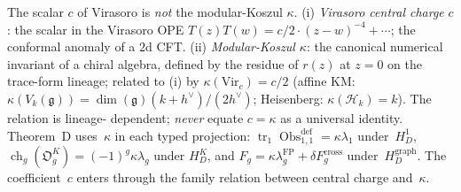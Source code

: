 \begin{description}[itemsep=4pt, leftmargin=2.0em, style=nextline]
\item[T19 (``central charge''--$c$ of Virasoro vs modular-Koszul $\kappa$).]
%
The scalar $c$ of Virasoro is \emph{not} the modular-Koszul $\kappa$.
(i) \emph{Virasoro central charge} $c$: the scalar in the Virasoro
OPE $T(z) T(w) = c/2 \cdot (z-w)^{-4} + \cdots$; the
conformal anomaly of a $2$d CFT.
(ii) \emph{Modular-Koszul $\kappa$}: the canonical numerical invariant
of a chiral algebra, defined by the residue of $r(z)$ at $z = 0$
on the trace-form lineage; related to (i) by
$\kappa(\mathrm{Vir}_c) = c/2$ (affine KM:
$\kappa(V_k(\mathfrak g)) = \dim(\mathfrak g)(k+h^\vee)/(2h^\vee)$;
Heisenberg: $\kappa(\mathcal H_k) = k$). The relation is lineage-
dependent; \emph{never} equate $c = \kappa$ as a universal identity.
Theorem~D uses~$\kappa$ in each typed projection:
$\operatorname{tr}_1\operatorname{Obs}^{\mathrm{def}}_{1,1}
=\kappa\lambda_1$ under~$H_D^1$,
$\operatorname{ch}_g(\mathfrak O_g^K)=(-1)^g\kappa\lambda_g$ under
$H_D^K$, and
$F_g=\kappa\lambda_g^{\mathrm{FP}}+\delta F_g^{\mathrm{cross}}$
under~$H_D^{\mathrm{graph}}$.  The coefficient~$c$ enters through the
family relation between central charge and~$\kappa$.


\end{description}
